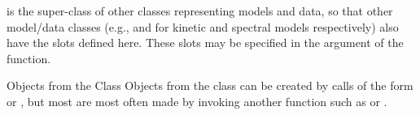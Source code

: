 \begin{Description}\relax
{} is the super-class of other classes representing models and data, so
that other model/data classes (e.g.,  and  
for kinetic and spectral
models respectively) also have the slots defined here.  These slots may
be specified in the  
argument of the   function.
\end{Description}
\begin{Section}{Objects from the Class}
Objects from the class 
can be created by calls of the form  or 
, but 
most are most often made by invoking another function such as 
 or .
\end{Section}
